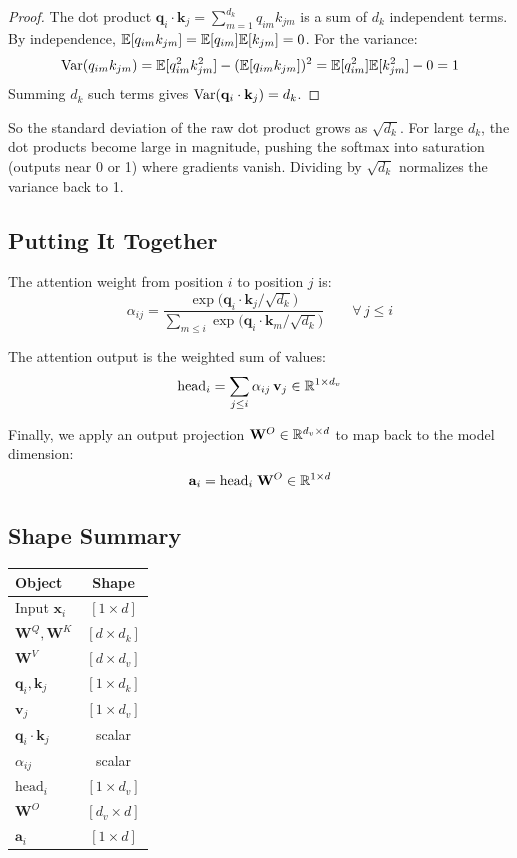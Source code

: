 \documentclass[main.tex]{subfiles}
\begin{document}
\begin{proof}
The dot product $\mathbf{q}_i \cdot \mathbf{k}_j = \sum_{m=1}^{d_k} q_{im} k_{jm}$ is a sum of $d_k$ independent terms. By independence, $\mathbb{E}[q_{im} k_{jm}] = \mathbb{E}[q_{im}]\mathbb{E}[k_{jm}] = 0$. For the variance:
$$\text{Var}(q_{im} k_{jm}) = \mathbb{E}[q_{im}^2 k_{jm}^2] - (\mathbb{E}[q_{im} k_{jm}])^2 = \mathbb{E}[q_{im}^2]\mathbb{E}[k_{jm}^2] - 0 = 1$$
Summing $d_k$ such terms gives $\text{Var}(\mathbf{q}_i \cdot \mathbf{k}_j) = d_k$.
\end{proof}

So the standard deviation of the raw dot product grows as $\sqrt{d_k}$. For large $d_k$, the dot products become large in magnitude, pushing the softmax into saturation (outputs near 0 or 1) where gradients vanish. Dividing by $\sqrt{d_k}$ normalizes the variance back to 1.

\subsection{Putting It Together}

The attention weight from position $i$ to position $j$ is:
$$\alpha_{ij} = \frac{\exp\!\big(\mathbf{q}_i \cdot \mathbf{k}_j / \sqrt{d_k}\big)}{\sum_{m \leq i} \exp\!\big(\mathbf{q}_i \cdot \mathbf{k}_m / \sqrt{d_k}\big)} \qquad \forall\, j \leq i$$

The attention output is the weighted sum of values:
$$\text{head}_i = \sum_{j \leq i} \alpha_{ij} \, \mathbf{v}_j \in \mathbb{R}^{1 \times d_v}$$

Finally, we apply an output projection $\mathbf{W}^O \in \mathbb{R}^{d_v \times d}$ to map back to the model dimension:
$$\mathbf{a}_i = \text{head}_i \; \mathbf{W}^O \in \mathbb{R}^{1 \times d}$$

\subsection{Shape Summary}

\begin{center}
\renewcommand{\arraystretch}{1.3}
\begin{tabular}{l c}
\hline
\textbf{Object} & \textbf{Shape} \\
\hline
Input $\mathbf{x}_i$ & $[1 \times d]$ \\
$\mathbf{W}^Q, \mathbf{W}^K$ & $[d \times d_k]$ \\
$\mathbf{W}^V$ & $[d \times d_v]$ \\
$\mathbf{q}_i, \mathbf{k}_j$ & $[1 \times d_k]$ \\
$\mathbf{v}_j$ & $[1 \times d_v]$ \\
$\mathbf{q}_i \cdot \mathbf{k}_j$ & scalar \\
$\alpha_{ij}$ & scalar \\
$\text{head}_i$ & $[1 \times d_v]$ \\
$\mathbf{W}^O$ & $[d_v \times d]$ \\
$\mathbf{a}_i$ & $[1 \times d]$ \\
\hline
\end{tabular}
\end{center}
\end{document}
